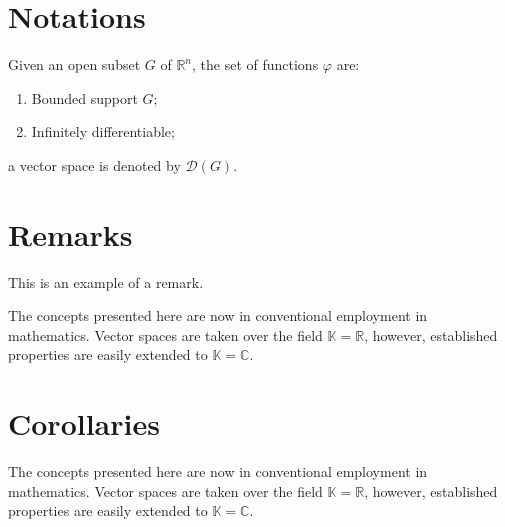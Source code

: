 
\section{Notations}

\begin{notation} %
	Given an open subset $G$ of $\mathbb{R}^n$, the set of functions $\varphi$ are:
	\begin{enumerate}
		\item Bounded support $G$;
		\item Infinitely differentiable;
	\end{enumerate}
	a vector space is denoted by $\mathcal{D}(G)$. 
\end{notation}


\section{Remarks}

This is an example of a remark.

\begin{remark}
	The concepts presented here are now in conventional employment in mathematics. Vector spaces are taken over the field $\mathbb{K}=\mathbb{R}$, however, established properties are easily extended to $\mathbb{K}=\mathbb{C}$.
\end{remark}


\section{Corollaries}

\begin{corollary}[Corollary name] %
	The concepts presented here are now in conventional employment in mathematics. Vector spaces are taken over the field $\mathbb{K}=\mathbb{R}$, however, established properties are easily extended to $\mathbb{K}=\mathbb{C}$.
\end{corollary}


